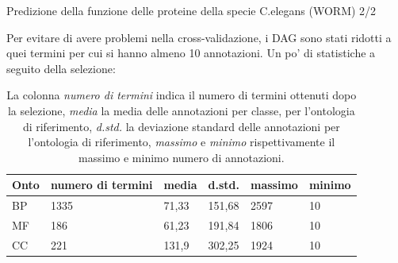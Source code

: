 \documentclass[9pt]{beamer}
\begin{document}
\begin{tframe}{Predizione della funzione delle proteine della specie C.elegans (WORM) 2/2}

Per evitare di avere problemi nella cross-validazione, i DAG sono stati ridotti a quei termini per cui si hanno almeno 10 annotazioni. Un po' di statistiche a seguito della selezione:
\begin{table}[h]
\centering
\begin{tabular}{|l|l|l|l|l|l|}
\hline
\textbf{Onto} & \textbf{numero di termini} & \textbf{media} & \textbf{d.std.} & \textbf{massimo} & \textbf{minimo} \\ \hline
BP            & 1335                & 71,33                & 151,68              & 2597                & 10                  \\ \hline
MF            & 186                 & 61,23                & 191,84              & 1806                & 10                  \\ \hline
CC            & 221                 & 131,9                & 302,25              & 1924                & 10                  \\ \hline
\end{tabular}
\caption{\footnotesize{La colonna \emph{numero di termini} indica il numero di termini ottenuti dopo la selezione, \emph{media} la media delle annotazioni per classe, per l'ontologia di riferimento, \emph{d.std.} la deviazione standard delle annotazioni per l'ontologia di riferimento, \emph{massimo} e \emph{minimo} rispettivamente il massimo e minimo numero di annotazioni.}}
\label{riduzioneann}
\end{table}
\end{tframe}
\end{document}
